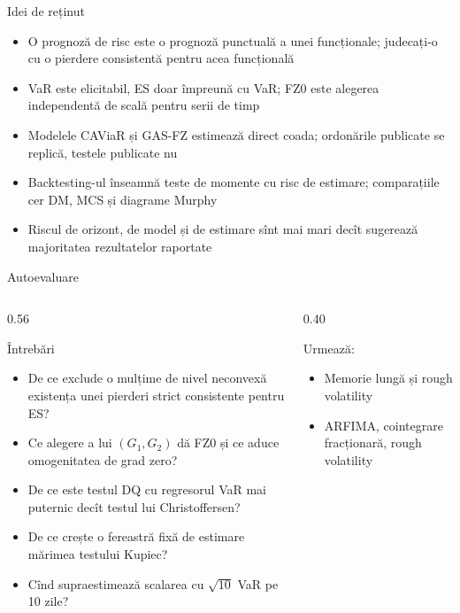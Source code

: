 \begin{frame}{Idei de reținut}
\itemsize{\small}
\begin{itemize}
    \item O prognoză de risc este o prognoză punctuală a unei funcționale; judecați-o cu o pierdere consistentă pentru acea funcțională
    \item VaR este elicitabil, ES doar împreună cu VaR; FZ0 este alegerea independentă de scală pentru serii de timp
    \item Modelele CAViaR și GAS-FZ estimează direct coada; ordonările publicate se replică, testele publicate nu
    \item Backtesting-ul înseamnă teste de momente cu risc de estimare; comparațiile cer DM, MCS și diagrame Murphy
    \item Riscul de orizont, de model și de estimare sînt mai mari decît sugerează majoritatea rezultatelor raportate
\end{itemize}
\end{frame}

\begin{frame}{Autoevaluare}
\itemsize{\small}
\begin{columns}[T]
\begin{column}{0.56\textwidth}
\begin{block}{Întrebări}
\begin{itemize}
    \item De ce exclude o mulțime de nivel neconvexă existența unei pierderi strict consistente pentru ES?
    \item Ce alegere a lui $(G_1, G_2)$ dă FZ0 și ce aduce omogenitatea de grad zero?
    \item De ce este testul DQ cu regresorul VaR mai puternic decît testul lui Christoffersen?
    \item De ce crește o fereastră fixă de estimare mărimea testului Kupiec?
    \item Cînd supraestimează scalarea cu $\sqrt{10}$ VaR pe 10 zile?
\end{itemize}
\end{block}
\end{column}
\begin{column}{0.40\textwidth}
\begin{block}{Urmează: }
\begin{itemize}
    \item Memorie lungă și rough volatility
    \item ARFIMA, cointegrare fracționară, rough volatility
\end{itemize}
\end{block}
\end{column}
\end{columns}
\end{frame}


